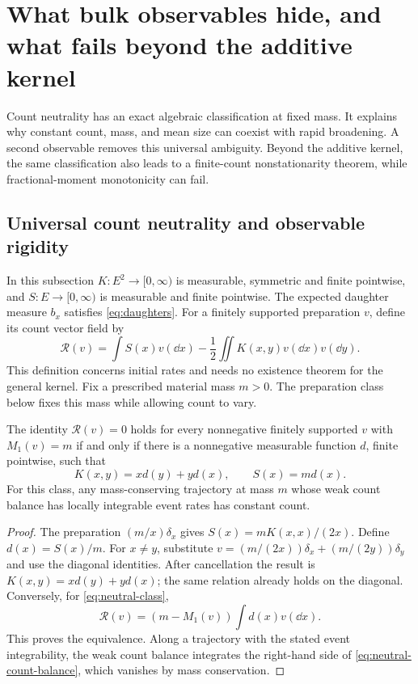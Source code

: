 \section{What bulk observables hide, and what fails beyond the additive kernel}
\label{sec:boundaries}

Count neutrality has an exact algebraic classification at fixed mass. It
explains why constant count, mass, and mean size can coexist with rapid
broadening. A second observable removes this universal ambiguity. Beyond
the additive kernel, the same classification also leads to a finite-count
nonstationarity theorem, while fractional-moment monotonicity can fail.

\subsection{Universal count neutrality and observable rigidity}

In this subsection $K:E^2\to[0,\infty)$ is measurable, symmetric and finite
pointwise, and $S:E\to[0,\infty)$ is measurable and finite pointwise. The
expected daughter measure $b_x$ satisfies \eqref{eq:daughters}. For a
finitely supported preparation $v$, define its count vector field by
\[
 \mathcal R(v)=\int S(x)v(\dd x)-\frac12\iint K(x,y)v(\dd x)v(\dd y).
\]
This definition concerns initial rates and needs no existence theorem for
the general kernel. Fix a prescribed material mass $m>0$. The preparation
class below fixes this mass while allowing count to vary.

\begin{theorem}\label{thm:neutral-class}
The identity $\mathcal R(v)=0$ holds for every nonnegative finitely
supported $v$ with $M_1(v)=m$ if and only if there is a nonnegative
measurable function $d$, finite pointwise, such that
\begin{equation}
 K(x,y)=xd(y)+yd(x),\qquad S(x)=md(x).
 \label{eq:neutral-class}
\end{equation}
For this class, any mass-conserving trajectory at mass $m$ whose weak count
balance has locally integrable event rates has constant count.
\end{theorem}

\begin{proof}
The preparation $(m/x)\delta_x$ gives
$S(x)=mK(x,x)/(2x)$. Define $d(x)=S(x)/m$. For $x\ne y$, substitute
$v=(m/(2x))\delta_x+(m/(2y))\delta_y$ and use the diagonal identities.
After cancellation the result is $K(x,y)=xd(y)+yd(x)$; the same relation
already holds on the diagonal. Conversely, for \eqref{eq:neutral-class},
\begin{equation}
 \mathcal R(v)=(m-M_1(v))\int d(x)v(\dd x).
 \label{eq:neutral-count-balance}
\end{equation}
This proves the equivalence. Along a trajectory with the stated event
integrability, the weak count balance integrates the right-hand side of
\eqref{eq:neutral-count-balance}, which vanishes by mass conservation.
\end{proof}

